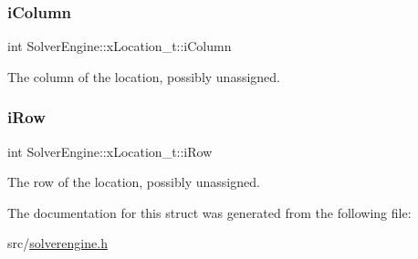 \subsubsection{\texorpdfstring{i\+Column}{iColumn}}
{\footnotesize\ttfamily int Solver\+Engine\+::x\+Location\+\_\+t\+::i\+Column}



The column of the location, possibly unassigned. 

\mbox{\label{struct_solver_engine_1_1x_location__t_a052ea5f4e2760513470f791b5c12a9b9}} 
\subsubsection{\texorpdfstring{i\+Row}{iRow}}
{\footnotesize\ttfamily int Solver\+Engine\+::x\+Location\+\_\+t\+::i\+Row}



The row of the location, possibly unassigned. 



The documentation for this struct was generated from the following file\+:\begin{DoxyCompactItemize}
\item 
src/\mbox{\hyperlink{solverengine_8h}{solverengine.\+h}}\end{DoxyCompactItemize}
